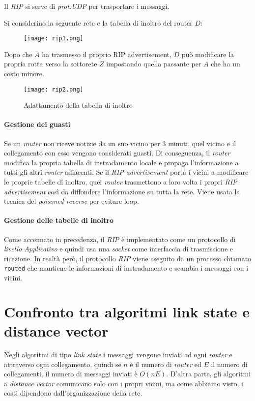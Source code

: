 \begin{note}
    Il \emph{RIP} si serve di \emph{\gls{prot:UDP}} per trasportare i messaggi.
\end{note}

\begin{eg}
Si considerino la seguente rete e la tabella di inoltro del router $D$:
\begin{figure}[h!]
    \centering
    \texttt{[image: rip1.png]}
\end{figure}

\noindent
Dopo che $A$ ha trasmesso il proprio RIP advertisement, $D$ può modificare la
propria rotta verso la sottorete $Z$ impostando quella passante per $A$ che ha
un costo minore.

\begin{figure}[h!]
    \centering
    \texttt{[image: rip2.png]}
    \caption{Adattamento della tabella di inoltro}
\end{figure}
\end{eg}

\paragraph{Gestione dei guasti}
Se un \emph{router} non riceve notizie da un suo vicino per 3 minuti, quel vicino
e il collegamento con esso vengono considerati guasti. Di conseguenza, il
\emph{router} modifica la propria tabella di instradamento locale e propaga
l'informazione a tutti gli altri \emph{router} adiacenti. Se il \emph{RIP
advertisement} porta i vicini a modificare le proprie tabelle di inoltro, quei
\emph{router} trasmettono a loro volta i propri \emph{RIP advertisement} così da
diffondere l'informazione su tutta la rete. Viene usata la tecnica del
\emph{poisoned reverse} per evitare loop.

\paragraph{Gestione delle tabelle di inoltro}
Come accennato in precedenza, il \emph{RIP} è implementato come un protocollo di
\emph{livello Applicativo} e quindi usa una \emph{socket} come interfaccia di
trasmissione e ricezione. In realtà però, il protocollo \emph{RIP} viene eseguito
da un processo chiamato \texttt{routed} che mantiene le informazioni di
instradamento e scambia i messaggi con i vicini.

\section{Confronto tra algoritmi link state e distance vector}
Negli algoritmi di tipo \emph{link state} i messaggi vengono inviati ad ogni
\emph{router} e attraverso ogni collegamento, quindi se $n$ è il numero di
\emph{router} ed $E$ il numero di collegamenti, il numero di messaggi inviati è
$O(nE)$. D'altra parte, gli algoritmi a \emph{distance vector} comunicano solo
con i propri vicini, ma come abbiamo visto, i costi dipendono dall'organizzazione
della rete.


